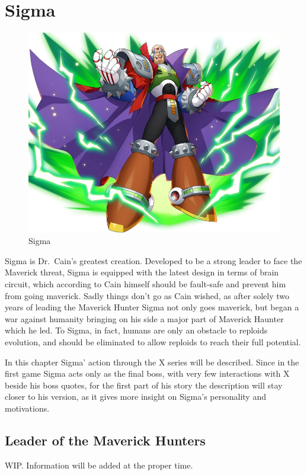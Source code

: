\chapter{Sigma}\label{char:Sigma}
\begin{figure}[htp]
	\centering
	\includegraphics[height=\BIGportraitsize]{figures/X1/Sigma_stages/X_DiVE_Sigma.png}
	\caption{Sigma}
\end{figure}
Sigma is Dr.~Cain's greatest creation. Developed to be a strong leader to face the Maverick threat, Sigma is equipped with the latest design in terms of brain circuit, which according to Cain himself should be fault-safe and prevent him from going maverick. Sadly things don't go as Cain wished, as after solely two years of leading the Maverick Hunter Sigma not only goes maverick, but began a war against humanity bringing on his side a major part of Maverick Haunter which he led. To Sigma, in fact, humans are only an obstacle to reploids evolution, and should be eliminated to allow reploids to reach their full potential. 

In this chapter Sigma' action through the X series will be described. Since in the first game Sigma acts only as the final boss, with very few interactions with X beside his boss quotes, for the first part of his story the description will stay closer to his \mhx version, as it gives more insight on Sigma's personality and motivations.

\section{Leader of the Maverick Hunters}
WIP. Information will be added at the proper time.

